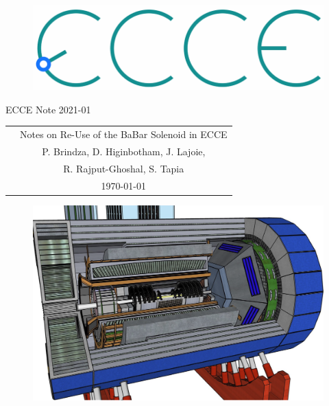\renewcommand*\familydefault{\sfdefault}
{\sffamily
\vfill
\vspace{4cm}
\begin{figure}[H]
  \begin{center}
  \includegraphics[width=0.3\linewidth]{figs/ecce-logo.png}
\end{center}
\end{figure}

\begin{center}
  \large
  {\LARGE{ECCE Note 2021-01}}

  \begin{tabular}{cc}
&Notes on Re-Use of the BaBar Solenoid in ECCE \\
&P. Brindza, D. Higinbotham, J. Lajoie, \\
&R. Rajput-Ghoshal, S. Tapia \\
&\today
\\
  \end{tabular}
  \end{center}

\vspace{1cm}

\begin{figure}[H]
  \begin{center}
    \includegraphics[width=0.7\linewidth]{figs/ECCE.png}
  \end{center}
\end{figure}
}


\vfill
\renewcommand*\familydefault{\rmdefault}
